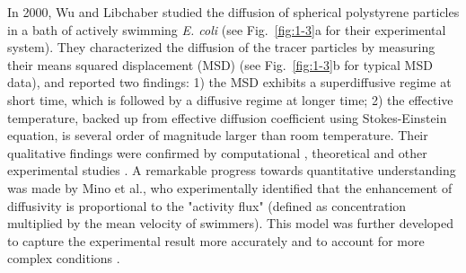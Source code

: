 In 2000, Wu and Libchaber studied the diffusion of spherical polystyrene particles in a bath of actively swimming \textit{E. coli} \cite{Wu2000} (see Fig.~\ref{fig:1-3}a for their experimental system). They characterized the diffusion of the tracer particles by measuring their means squared displacement (MSD) (see Fig.~\ref{fig:1-3}b for typical MSD data), and reported two findings: 1) the MSD exhibits a superdiffusive regime at short time, which is followed by a diffusive regime at longer time; 2) the effective temperature, backed up from effective diffusion coefficient using Stokes-Einstein equation, is several order of magnitude larger than room temperature. Their qualitative findings were confirmed by computational \cite{Underhill2008, Lin2011}, theoretical \cite{Golestanian2009} and other experimental studies
\cite{Chen2007, Leptos2009, Mino2011, Kurtuldu2011, Patteson2016}. A remarkable progress towards quantitative understanding was made by Mino et al., who experimentally identified that the enhancement of diffusivity is proportional to the "activity flux" (defined as concentration multiplied by the mean velocity of swimmers). This model was further developed to capture the experimental result more accurately and to account for more complex conditions \cite{Mino2013, Kasyap2014, Morozov2014}.

